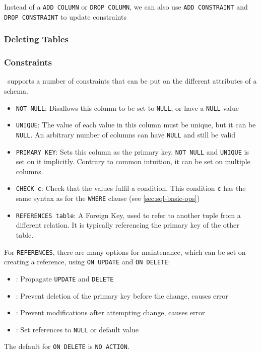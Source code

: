 
Instead of a \texttt{ADD COLUMN} or \texttt{DROP COLUMN}, we can also use \texttt{ADD CONSTRAINT} and \texttt{DROP CONSTRAINT} to update constraints


\subsubsection{Deleting Tables}



\subsubsection{Constraints}
\sql\ supports a number of constraints that can be put on the different attributes of a schema.
\begin{itemize}
    \item \texttt{NOT NULL}: Disallows this column to be set to \texttt{NULL}, or have a \texttt{NULL} value
    \item \texttt{UNIQUE}: The value of each value in this column must be unique, but it can be \texttt{NULL}.
          An arbitrary number of columns can have \texttt{NULL} and still be valid
    \item \texttt{PRIMARY KEY}: Sets this column as the primary key. \texttt{NOT NULL} and \texttt{UNIQUE} is set on it implicitly.
          Contrary to common intuition, it can be set on multiple columns.
    \item \texttt{CHECK c}: Check that the values fulfil a condition.
          This condition \texttt{c} has the same syntax as for the \texttt{WHERE} clause (see \ref{sec:sql-basic-ops})
    \item \texttt{REFERENCES table}: A Foreign Key, used to refer to another tuple from a different relation.
          It is typically referencing the primary key of the other table.
\end{itemize}
For \texttt{REFERENCES}, there are many options for maintenance, which can be set on creating a reference, using \texttt{ON UPDATE} and \texttt{ON DELETE}:
\begin{itemize}
    \item {}: Propagate \texttt{UPDATE} and \texttt{DELETE}
    \item {}: Prevent deletion of the primary key before the change, causes error
    \item {}: Prevent modifications after attempting change, causes error
    \item {}: Set references to \texttt{NULL} or default value
\end{itemize}
The default for \texttt{ON DELETE} is \texttt{NO ACTION}.

